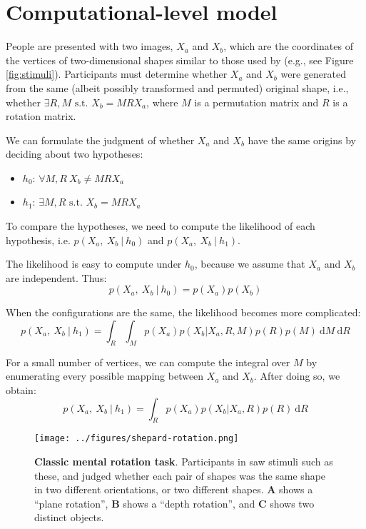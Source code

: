 \documentclass{article} %
\begin{document}
\section{Computational-level model}

People are presented with two images, $X_a$ and $X_b$, which are the
coordinates of the vertices of two-dimensional shapes similar to those
used by \cite{Cooper:1975wp} (e.g., see Figure
\ref{fig:stimuli}). Participants must determine whether $X_a$ and
$X_b$ were generated from the same (albeit possibly transformed and
permuted) original shape, i.e., whether $\exists R,M\textrm{ s.t. }
X_b=MRX_a$, where $M$ is a permutation matrix and $R$ is a rotation
matrix.

We can formulate the judgment of whether $X_a$ and $X_b$ have the same
origins by deciding about two hypotheses:

\begin{itemize}
\itemsep1pt\parskip0pt
\item
  $h_0$: $\forall M,R\ X_b\neq MRX_a$
\item
  $h_1$: $\exists M,R\textrm{ s.t. } X_b=MRX_a$
\end{itemize}

To compare the hypotheses, we need to compute the likelihood of each
hypothesis, i.e. $p(X_a,\ X_b\ \vert \ h_0)$ and $p(X_a,\ X_b\ \vert \
h_1)$.

The likelihood is easy to compute under $h_0$, because we assume that
$X_a$ and $X_b$ are independent. Thus:
\begin{equation}
  p(X_a,\ X_b\ \vert \ h_0)=p(X_a)p(X_b)
  \label{eq:lh-h0}
\end{equation}

When the configurations are the same, the likelihood becomes more
complicated:
\begin{equation} 
  p(X_a,\ X_b\ \vert \ h_1)=\int_R\int_M p(X_a) p(X_b\vert X_a,R,M) p(R) p(M)\ \mathrm{d}M\ \mathrm{d}R
\end{equation}

For a small number of vertices, we can compute the integral over $M$
by enumerating every possible mapping between $X_a$ and $X_b$. After
doing so, we obtain:
\begin{equation} 
  p(X_a,\ X_b\ \vert \ h_1)=\int_R p(X_a) p(X_b\vert X_a,R) p(R)\ \mathrm{d}R
\end{equation}

\begin{figure}[t]
  \centering
  \texttt{[image: ../figures/shepard-rotation.png]}
  \caption{\textbf{Classic mental rotation task}. Participants in
    \cite{Shepard1971} saw stimuli such as these, and judged whether
    each pair of shapes was the same shape in two different
    orientations, or two different shapes. \textbf{A} shows a ``plane
    rotation'', \textbf{B} shows a ``depth rotation'', and \textbf{C}
    shows two distinct objects.}
  \label{fig:mental-rotation}
\end{figure}
\end{document}
